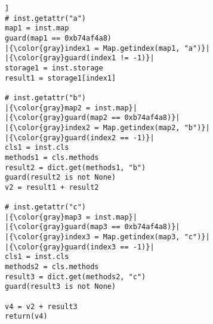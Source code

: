 \begin{lstlisting}[escapechar=|,basicstyle=\ttfamily]]
# inst.getattr("a")
map1 = inst.map
guard(map1 == 0xb74af4a8)
|{\color{gray}index1 = Map.getindex(map1, "a")}|
|{\color{gray}guard(index1 != -1)}|
storage1 = inst.storage
result1 = storage1[index1]

# inst.getattr("b")
|{\color{gray}map2 = inst.map}|
|{\color{gray}guard(map2 == 0xb74af4a8)}|
|{\color{gray}index2 = Map.getindex(map2, "b")}|
|{\color{gray}guard(index2 == -1)}|
cls1 = inst.cls
methods1 = cls.methods
result2 = dict.get(methods1, "b")
guard(result2 is not None)
v2 = result1 + result2

# inst.getattr("c")
|{\color{gray}map3 = inst.map}|
|{\color{gray}guard(map3 == 0xb74af4a8)}|
|{\color{gray}index3 = Map.getindex(map3, "c")}|
|{\color{gray}guard(index3 == -1)}|
cls1 = inst.cls
methods2 = cls.methods
result3 = dict.get(methods2, "c")
guard(result3 is not None)

v4 = v2 + result3
return(v4)
\end{lstlisting}
